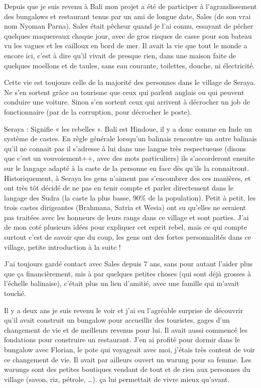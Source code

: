 Depuis que je suis revenu à Bali mon projet a été de participer à l’agrandissement des bungalows et restaurant tenus par un ami de longue date, Sales (de son vrai nom Nyoman Parna). Sales était pêcheur quand je l’ai connu, essayant de pêcher quelques maquereaux chaque jour, avec de gros risques de casse pour son bateau vu les vagues et les cailloux en bord de mer. Il avait la vie que tout le monde a encore ici, c’est à dire qu’il vivait de presque rien, dans une maison faite de quelques moellons et de taules, sans eau courante, toilettes, douche, ni électricité.

Cette vie est toujours celle de la majorité des personnes dans le village de Seraya. Ne s’en sortent grâce au tourisme que ceux qui parlent anglais ou qui peuvent conduire une voiture. Sinon s’en sortent ceux qui arrivent à décrocher un job de fonctionnaire (par de la corruption, pour décrocher le poste).

Seraya : Signifie « les rebelles ». Bali est Hindoue, il y a donc comme en Inde un système de castes. En règle générale lorsqu’un balinais rencontre un autre balinais qu’il ne connait pas il s’adresse à lui dans une langue très respectueuse (disons que c’est un vouvoiement++, avec des mots particuliers) ils s’accorderont ensuite sur le langage adapté à la caste de la personne en face dès qu’ils la connaitront. Historiquement, à Seraya les gens n’aiment pas s’encombrer des ces manières, et ont très tôt décidé de ne pas en tenir compte et parler directement dans le langage des Sudra (la caste la plus basse, 90\% de la population). Petit à petit, les trois castes dirigeantes (Brahmana, Satria et Wesia) ont su qu’elles ne seraient pas traitées avec les honneurs de leurs rangs dans ce village et sont parties. J’ai de mon coté plusieurs idées pour expliquer cet esprit rebel, mais ce qui compte surtout c’est de savoir que du coup, les gens ont des fortes personnalités dans ce village, petite introduction à la suite !

J’ai toujours gardé contact avec Sales depuis 7 ans, sans pour autant l’aider plus que ça financièrement, mis à par quelques petites choses (qui sont déjà grosses à l’échelle balinaise), c’était plus un lien d’amitié, avec une famille qui m’avait touché.

Il y a deux ans je suis revenu le voir et j’ai eu l’agréable surprise de découvrir qu’il avait construit un bungalow pour accueillir des touristes, gages d’un changement de vie et de meilleurs revenus pour lui. Il avait aussi commencé les fondations pour construire un restaurant. J’en ai profité pour dormir dans le bungalow avec Florian, le pote qui voyageait avec moi, j’étais très content de voir ce changement de vie. Il avait par ailleurs ouvert un warung pour sa femme. Les warungs sont des petites boutiques vendant de tout et de rien aux personnes du village (savon, riz, pétrole, …). ça lui permettait de vivre mieux qu’avant.

